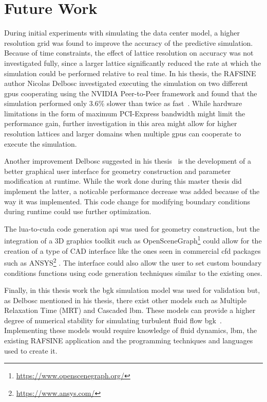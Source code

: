 \section{Future Work}
During initial experiments with simulating the data center model, a higher resolution grid was found to improve the accuracy of the predictive simulation. Because of time constraints, the effect of lattice resolution on accuracy was not investigated fully, since a larger lattice significantly reduced the rate at which the simulation could be performed relative to real time. In his thesis, the RAFSINE author Nicolas Delbosc investigated executing the simulation on two different \gls{gpu}s cooperating using the NVIDIA Peer-to-Peer framework and found that the simulation performed only 3.6\% slower than twice as fast~\cites[pg.100]{Delbosc}. While hardware limitations in the form of maximum PCI-Express bandwidth might limit the performance gain, further investigation in this area might allow for higher resolution lattices and larger domains when multiple \gls{gpu}s can cooperate to execute the simulation.

Another improvement Delbosc suggested in his thesis~\cites[pg.195]{Delbosc} is the development of a better graphical user interface for geometry construction and parameter modification at runtime. While the work done during this master thesis did implement the latter, a noticable performance decrease was added because of the way it was implemented. This code change for modifying boundary conditions during runtime could use further optimization. 

The \gls{lua}-to-\gls{cuda} code generation \gls{api} was used for geometry construction, but the integration of a 3D graphics toolkit such as OpenSceneGraph\footnote{\url{https://www.openscenegraph.org/}} could allow for the creation of a type of CAD interface like the ones seen in commercial \gls{cfd} packages such as ANSYS\footnote{\url{https://www.ansys.com/}} . The interface could also allow the user to set custom boundary conditions functions using code generation techniques similar to the existing ones.

Finally, in this thesis work the \gls{bgk} simulation model was used for validation but, as Delbosc mentioned in his thesis, there exist other models such as Multiple Relaxation Time (MRT) and Cascaded \gls{lbm}. These models can provide a higher degree of numerical stability for simulating turbulent fluid flow \gls{bgk}~\cites[pg.196]{Delbosc}. Implementing these models would require knowledge of fluid dynamics, \gls{lbm}, the existing RAFSINE application and the programming techniques and languages used to create it.

